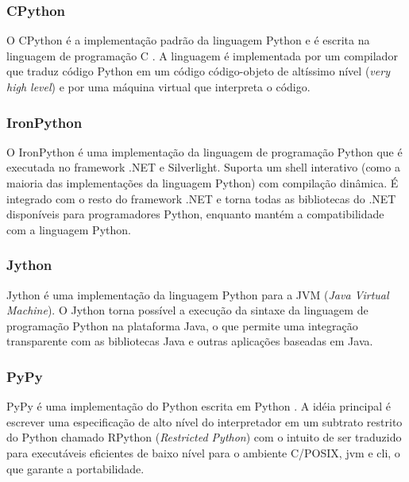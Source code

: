 \subsubsection{CPython}

O CPython é a implementação padrão da linguagem Python e é escrita na linguagem de programação C \cite[p.6]{pypy}. A linguagem é implementada por um compilador que traduz código Python em um código código-objeto de altíssimo nível (\emph{very high level}) e por uma máquina virtual que interpreta o código.

\subsubsection{IronPython}

O IronPython \cite{ironpython} é uma implementação da linguagem de programação Python que é executada no framework .NET e Silverlight. Suporta um \gls{shell} interativo (como a maioria das implementações da linguagem Python) com compilação dinâmica. É integrado com o resto do framework .NET e torna todas as bibliotecas do .NET disponíveis para programadores Python, enquanto mantém a compatibilidade com a linguagem Python.

\subsubsection{Jython}

Jython \cite{jython} é uma implementação da linguagem Python para a JVM (\emph{Java Virtual Machine}). O Jython torna possível a execução da sintaxe da linguagem de programação Python na plataforma Java, o que permite uma integração transparente com as bibliotecas Java e outras aplicações baseadas em Java. 

\subsubsection{PyPy}

PyPy é uma implementação do Python escrita em Python \cite[p. 7]{pypy}. A idéia principal é escrever uma especificação de alto nível do interpretador em um subtrato restrito do Python chamado RPython (\emph{Restricted Python}) com o intuito de ser traduzido para executáveis eficientes de baixo nível para o ambiente C/POSIX, \gls{jvm} e \Gls{cli}, o que garante a portabilidade. 


